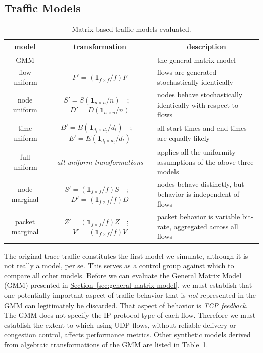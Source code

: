 \documentclass[conference]{IEEEtran}
\newcommand{\caps}[1]{{\small{#1}}}
\newcommand{\Section}[1]{\hyperref[sec:#1]{Section~\ref*{sec:#1}}}
\newcommand{\Table}[1]{\hyperref[tab:#1]{Table~\ref*{tab:#1}}}
\newcommand{\ones}[1]{\mathbf{1}_{#1}}
\begin{document}
\subsection{Traffic Models}
\label{sec:traffic-models}

\begin{table}
\begin{center}
\small
\begin{tabular}{|c|c|l|}
\multicolumn{1}{c}{\textbf{model}} &
\multicolumn{1}{c}{\textbf{transformation}} &
\multicolumn{1}{c}{\textbf{description}} \\
\hline
{\footnotesize{GMM}} & --- & the general matrix model \\\hline\hline
flow uniform & $F'=(\ones{f \times f}/f)F$ & flows are generated stochastically identically \\\hline
node uniform & $S'=S(\ones{n \times n}/n)$~~;~~$D'=D(\ones{n \times n}/n)$ & nodes behave stochastically identically with respect to flows \\\hline
time uniform & $B'=B(\ones{d_t \times d_t}/d_t)$~~;~~$E'=E(\ones{d_t \times d_t}/d_t)$ & all start times and end times are equally likely \\\hline
full uniform & \textit{all uniform transformations} & applies all the uniformity assumptions of the above three models \\\hline\hline
node marginal & $S'=(\ones{f \times f}/f)S$~~;~~$D'=(\ones{f \times f}/f)D$ & nodes behave distinctly, but behavior is independent of flows \\\hline
packet marginal & $Z'=(\ones{f \times f}/f)Z$~~;~~$V'=(\ones{f \times f}/f)V$ & packet behavior is variable bit-rate, aggregated across all flows \\\hline
\end{tabular}
\caption{Matrix-based traffic models evaluated.}
\label{tab:traffic-models}
\end{center}
\end{table}

The original trace traffic constitutes the first model we simulate, although it is not really a model, {per se}. This serves as a control group against which to compare all other models. Before we can evaluate the General Matrix Model (\caps{GMM}) presented in \Section{general-matrix-model}, we must establish that one potentially important aspect of traffic behavior that is \textit{not} represented in the \caps{GMM} can legitimately be discarded. That aspect of behavior is \textit{\caps{TCP} feedback}. The \caps{GMM} does not specify the \caps{IP} protocol type of each flow. Therefore we must establish the extent to which using \caps{UDP} flows, without reliable delivery or congestion control, affects performance metrics.
Other synthetic models derived from algebraic transformations of the \caps{GMM} are listed in \Table{traffic-models}.
\end{document}
